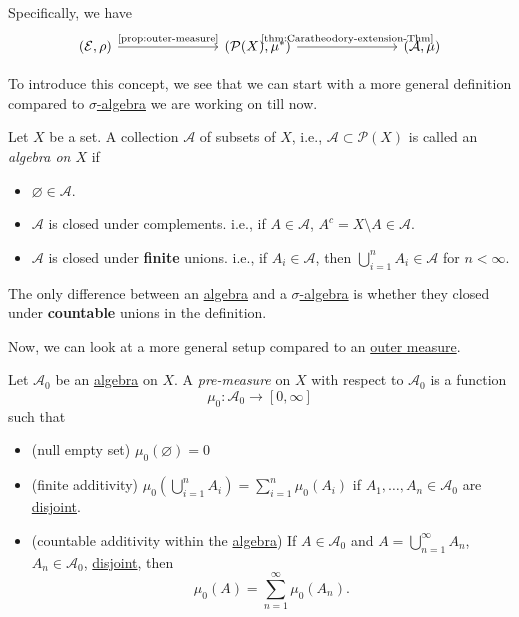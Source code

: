 Specifically, we have
\[
	\begin{tikzcd}
		(\mathcal{E}, \rho) \ar[rrr, "\text{\autoref{prop:outer-measure}}"] &&& (\mathcal{P}(X), \mu^{\ast} ) \ar[rrr, "\text{\autoref{thm:Caratheodory-extension-Thm}}"] &&& (\mathcal{A} , \mu)
	\end{tikzcd}
\]

\par To introduce this concept, we see that we can start with a more general definition compared to \hyperref[def:sigma-algebra]{\(\sigma\)-algebra} we are working on till now.
\begin{definition}[Algebra]\label{def:algebra}
	Let \(X\) be a set. A collection \(\mathcal{A} \) of subsets of \(X\), i.e., \(\mathcal{A}\subset \mathcal{P} (X) \) is called an \emph{algebra on \(X\)} if
	\begin{itemize}
		\item \(\varnothing \in \mathcal{A} \).
		\item \(\mathcal{A} \) is closed under complements. i.e., if \(A\in \mathcal{A} \), \(A^c = X\setminus A\in \mathcal{A} \).
		\item \(\mathcal{A} \) is closed under \textbf{finite} unions. i.e., if \(A_i\in \mathcal{A} \), then \(\bigcup\limits_{i=1}^{n} A_{i}\in \mathcal{A} \) for \(n<\infty \).
	\end{itemize}
\end{definition}
\begin{remark}
	The only difference between an \hyperref[def:algebra]{algebra} and a \hyperref[def:sigma-algebra]{\(\sigma\)-algebra} is whether they closed under \textbf{countable} unions in the definition.
\end{remark}

\par Now, we can look at a more general setup compared to an \hyperref[def:outer-measure]{outer measure}.
\begin{definition}\label{def:pre-measure}
	Let \(\mathcal{A} _0\) be an \hyperref[def:algebra]{algebra} on \(X\). A \emph{pre-measure} on \(X\) with respect to \(\mathcal{A} _0\) is a function
	\[
		\mu_0 \colon \mathcal{A} _0\to [0, \infty ]
	\]
	such that
	\begin{itemize}
		\item\label{def:pre-measure-null-empty-set}(null empty set) \(\mu_0(\varnothing ) = 0\)
		\item\label{def:pre-measure-finite-additivity}(finite additivity) \(\mu_0\left(\bigcup\limits_{i=1}^{n} A_{i}\right) = \sum\limits_{i=1}^{n} \mu_0(A_{i})\) if
		\(A_1, \dots , A_n\in \mathcal{A} _0 \) are \underline{disjoint}.
		\item\label{def:pre-measure-countable-additivity-within-the-algebra}(countable additivity within the \hyperref[def:algebra]{algebra}) If \(A\in\mathcal{A} _0\) and \(A = \bigcup\limits_{n=1}^{\infty} A_{n}\),
		\(A_n\in\mathcal{A} _0\), \underline{disjoint}, then
		\[
			\mu_0(A) = \sum\limits_{n=1}^{\infty} \mu_0(A_{n}).
		\]
	\end{itemize}
\end{definition}

